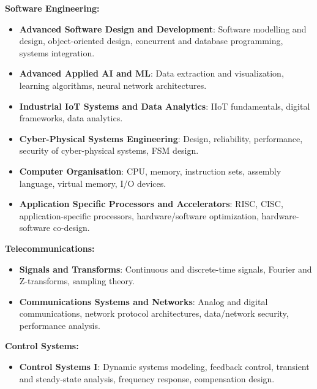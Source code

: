 \documentclass[A4,10pt]{article}
\begin{document}
\begin{itemize}[leftmargin=0.05in, label={}]
{    %
    \item \textbf{Software Engineering:}
    \begin{itemize}[leftmargin=0.15in, label={}]
        \item \textbf{Advanced Software Design and Development}{: Software modelling and design, object-oriented design, concurrent and database programming, systems integration.}\\
        \item \textbf{Advanced Applied AI and ML}{: Data extraction and visualization, learning algorithms, neural network architectures.}\\
        \item \textbf{Industrial IoT Systems and Data Analytics}{: IIoT fundamentals, digital frameworks, data analytics.}\\
        \item \textbf{Cyber-Physical Systems Engineering}{: Design, reliability, performance, security of cyber-physical systems, FSM design.}\\
        \item \textbf{Computer Organisation}{: CPU, memory, instruction sets, assembly language, virtual memory, I/O devices.}\\
        \item \textbf{Application Specific Processors and Accelerators}{: RISC, CISC, application-specific processors, hardware/software optimization, hardware-software co-design.}\\
    \end{itemize}
    
    \item \textbf{Telecommunications:}\\
    \begin{itemize}[leftmargin=0.15in, label={}]
        \item \textbf{Signals and Transforms}{: Continuous and discrete-time signals, Fourier and Z-transforms, sampling theory.}\\
        \item \textbf{Communications Systems and Networks}{: Analog and digital communications, network protocol architectures, data/network security, performance analysis.}\\
    \end{itemize}
    
    \item \textbf{Control Systems:}\\
    \begin{itemize}[leftmargin=0.15in, label={}]
        \item \textbf{Control Systems I}{: Dynamic systems modeling, feedback control, transient and steady-state analysis, frequency response, compensation design.}\\
    \end{itemize}
    }
\end{itemize}
\end{document}
